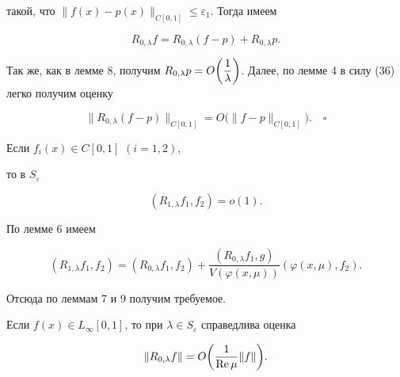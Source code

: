 такой, что $\| f(x)-p(x)\|_{C[0,1]}\le\varepsilon_1$. Тогда имеем


$$


R_{0,\lambda}f= R_{0,\lambda}(f-p)+R_{0,\lambda}p.


$$


Так же, как в лемме 8, получим $ R_{0,\lambda}p=O\bigg(\dfrac{\di1}


{\di\lambda}\bigg)$. Далее, по лемме 4 в силу (36) легко получим оценку


$$


\| R_{0,\lambda}(f-p)\|_{C[0,1]}=O\big(\|f-p\|_{C[0,1]}\big).\quad\square


$$





\begin{lem}


Если $f_i(x)\in C[0,1]$ $(i=1,2)$,


то в $S_\varepsilon$


$$


(R_{1,\lambda}f_1,f_2)=o(1).


$$


\end{lem}





\begin{pf} По лемме 6 имеем


$$


(R_{1,\lambda}f_1,f_2)=(R_{0,\lambda}f_1,f_2)+\frac{ (R_{0,\lambda}


f_1,g)}{V(\varphi(x,\mu))}( \varphi(x,\mu),f_2).


$$


Отсюда по леммам 7 и 9 получим требуемое.


\end{pf}





\begin{lem}


Если $f(x)\in L_\infty[0,1]$, то при $\lambda\in


S_\varepsilon$ справедлива оценка


$$


\| R_{0,\lambda}f\|=O\bigg(\frac1{{\RE}\,\mu}\|f\|\bigg).


$$


\end{lem}





